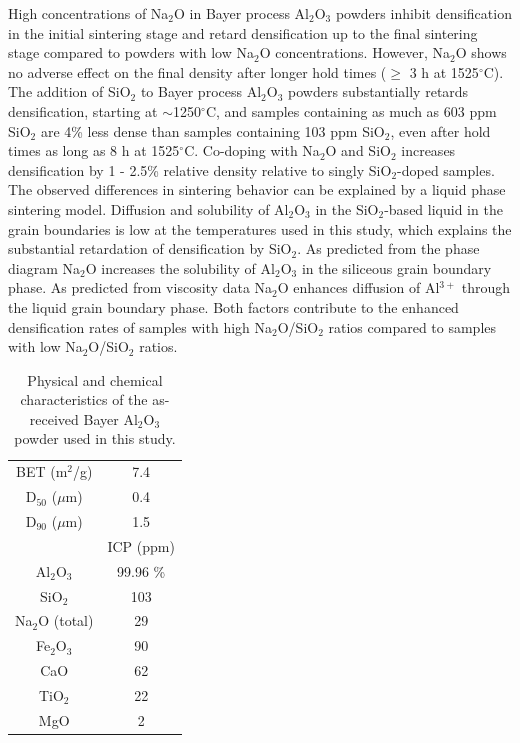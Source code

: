 High concentrations of Na$_{2}$O in Bayer process Al$_{2}$O$_{3}$ powders inhibit densification in the initial sintering stage and retard densification up to the final sintering stage compared to powders with low Na$_{2}$O concentrations. However, Na$_{2}$O shows no adverse effect on the final density after longer hold times ($\geq$ 3 h at 1525$^{\circ}$C). The addition of SiO$_{2}$ to Bayer process Al$_{2}$O$_{3}$ powders substantially retards densification, starting at $\sim$1250$^{\circ}$C, and samples containing as much as 603 ppm SiO$_{2}$ are 4\% less dense than samples containing 103 ppm SiO$_{2}$, even after hold times as long as 8 h at 1525$^{\circ}$C. Co-doping with Na$_{2}$O and SiO$_{2}$ increases densification by 1 - 2.5\% relative density relative to singly SiO$_{2}$-doped samples. The observed differences in sintering behavior can be explained by a liquid phase sintering model. Diffusion and solubility of Al$_{2}$O$_{3}$ in the SiO$_{2}$-based liquid in the grain boundaries is low at the temperatures used in this study, which explains the substantial retardation of densification by SiO$_{2}$. As predicted from the phase diagram Na$_{2}$O increases the solubility of Al$_{2}$O$_{3}$ in the siliceous grain boundary phase. As predicted from viscosity data Na$_{2}$O enhances diffusion of Al$^{3+}$ through the liquid grain boundary phase. Both factors contribute to the enhanced densification rates of samples with high Na$_{2}$O/SiO$_{2}$ ratios compared to samples with low Na$_{2}$O/SiO$_{2}$ ratios.

\newpage
\begin{table}[H]
	\caption{Physical and chemical characteristics of the as-received Bayer Al$_{2}$O$_{3}$ powder used in this study.}
	\centering
	\begin{tabular}{ | c | c | }
		\hline
		 & \\
		\hline
		BET (m$^{2}$/g) & 7.4 \\
		\hline
		D$_{50}$ ($\mu$m) & 0.4 \\
		\hline
		D$_{90}$ ($\mu$m) & 1.5 \\
		\hline
		 & ICP (ppm) \\
		\hline
		Al$_{2}$O$_{3}$ & 99.96 \% \\
		\hline
		SiO$_{2}$ & 103 \\
		\hline
		Na$_{2}$O (total) & 29 \\
		\hline
		Fe$_{2}$O$_{3}$ & 90 \\
		\hline
		CaO & 62 \\
		\hline
		TiO$_{2}$ & 22 \\
		\hline
		MgO & 2 \\
		\hline
	\end{tabular}
	\label{Ch3-table:table1}
\end{table}
\clearpage

